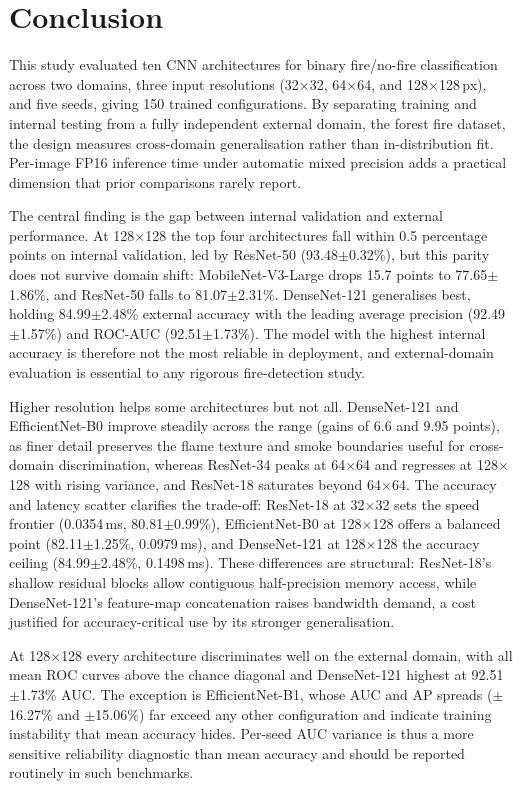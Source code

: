 \documentclass[conference]{IEEEtran}
\begin{document}
\section{Conclusion}

This study evaluated ten CNN architectures for binary fire/no-fire classification across two domains, three input resolutions (32$\times$32, 64$\times$64, and 128$\times$128\,px), and five seeds, giving 150 trained configurations. By separating training and internal testing from a fully independent external domain, the forest fire dataset, the design measures cross-domain generalisation rather than in-distribution fit. Per-image FP16 inference time under automatic mixed precision adds a practical dimension that prior comparisons rarely report.

The central finding is the gap between internal validation and external performance. At 128$\times$128 the top four architectures fall within 0.5 percentage points on internal validation, led by ResNet-50 (93.48$\pm$0.32\%), but this parity does not survive domain shift: MobileNet-V3-Large drops 15.7 points to 77.65$\pm$1.86\%, and ResNet-50 falls to 81.07$\pm$2.31\%. DenseNet-121 generalises best, holding 84.99$\pm$2.48\% external accuracy with the leading average precision (92.49$\pm$1.57\%) and ROC-AUC (92.51$\pm$1.73\%). The model with the highest internal accuracy is therefore not the most reliable in deployment, and external-domain evaluation is essential to any rigorous fire-detection study.

Higher resolution helps some architectures but not all. DenseNet-121 and EfficientNet-B0 improve steadily across the range (gains of 6.6 and 9.95 points), as finer detail preserves the flame texture and smoke boundaries useful for cross-domain discrimination, whereas ResNet-34 peaks at 64$\times$64 and regresses at 128$\times$128 with rising variance, and ResNet-18 saturates beyond 64$\times$64. The accuracy and latency scatter clarifies the trade-off: ResNet-18 at 32$\times$32 sets the speed frontier (0.0354\,ms, 80.81$\pm$0.99\%), EfficientNet-B0 at 128$\times$128 offers a balanced point (82.11$\pm$1.25\%, 0.0979\,ms), and DenseNet-121 at 128$\times$128 the accuracy ceiling (84.99$\pm$2.48\%, 0.1498\,ms). These differences are structural: ResNet-18's shallow residual blocks allow contiguous half-precision memory access, while DenseNet-121's feature-map concatenation raises bandwidth demand, a cost justified for accuracy-critical use by its stronger generalisation.

At 128$\times$128 every architecture discriminates well on the external domain, with all mean ROC curves above the chance diagonal and DenseNet-121 highest at 92.51$\pm$1.73\% AUC. The exception is EfficientNet-B1, whose AUC and AP spreads ($\pm$16.27\% and $\pm$15.06\%) far exceed any other configuration and indicate training instability that mean accuracy hides. Per-seed AUC variance is thus a more sensitive reliability diagnostic than mean accuracy and should be reported routinely in such benchmarks.
\end{document}
